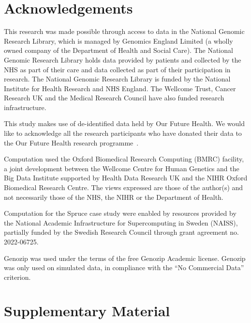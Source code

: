 \documentclass[a4paper,num-refs]{oup-contemporary}
\begin{document}
\section{Acknowledgements}
This research was made possible through access to data in the National Genomic
Research Library, which is managed by Genomics England Limited (a wholly owned
company of the Department of Health and Social Care). The National Genomic
Research Library holds data provided by patients and collected by the NHS as
part of their care and data collected as part of their participation in
research. The National Genomic Research Library is funded by the National
Institute for Health Research and NHS England. The Wellcome Trust, Cancer
Research UK and the Medical Research Council have also funded research
infrastructure.

This study makes use of de-identified data held by Our Future Health. 
We would like to acknowledge all the research participants who have donated 
their data to the Our Future Health research programme~\cite{ofhpubpolicy}.

Computation used the Oxford Biomedical Research Computing (BMRC) facility, a
joint development between the Wellcome Centre for Human Genetics and the Big
Data Institute supported by Health Data Research UK and the NIHR Oxford
Biomedical Research Centre. The views expressed are those of the author(s) and
not necessarily those of the NHS, the NIHR or the Department of Health.

Computation for the Spruce case study were enabled by resources
provided by the National Academic Infrastructure for Supercomputing in
Sweden (NAISS), partially funded by the Swedish Research Council
through grant agreement no. 2022-06725.

Genozip was used under the terms of the free Genozip Academic license.
Genozip was only used on simulated data, in compliance with
the ``No Commercial Data'' criterion.



\renewcommand\thefigure{S\arabic{figure}}
\setcounter{figure}{0}
\renewcommand\thetable{S\arabic{table}}
\setcounter{table}{0}

\section*{Supplementary Material}
\end{document}
